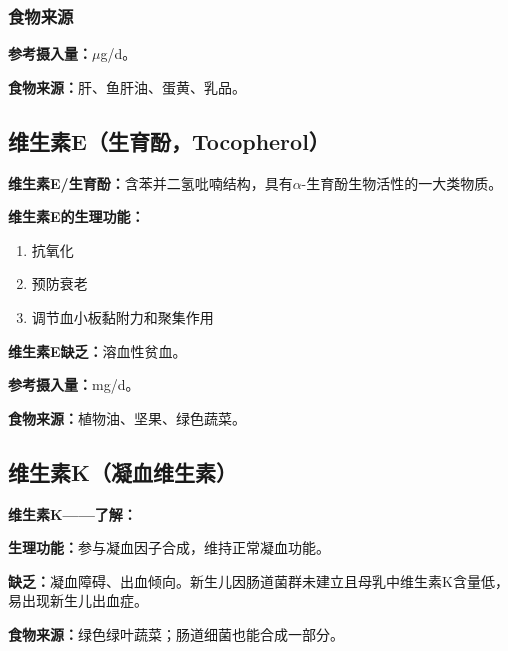 \subsubsection{食物来源}

\begin{keybox}
\textbf{参考摄入量：}$\mu$g/d。

\textbf{食物来源：}肝、鱼肝油、蛋黄、乳品。
\end{keybox}

\subsection{维生素E（生育酚，Tocopherol）}

\begin{defbox}
\textbf{维生素E/生育酚：}含苯并二氢吡喃结构，具有$\alpha$-生育酚生物活性的一大类物质。
\end{defbox}

\begin{keybox}
\textbf{维生素E的生理功能：}
\begin{enumerate}[leftmargin=*]
    \item 抗氧化
    \item 预防衰老
    \item 调节血小板黏附力和聚集作用
\end{enumerate}

\textbf{维生素E缺乏：}溶血性贫血。

\textbf{参考摄入量：}mg/d。

\textbf{食物来源：}植物油、坚果、绿色蔬菜。
\end{keybox}

\subsection{维生素K（凝血维生素）}

\begin{tipbox}
\textbf{维生素K——了解：}

\textbf{生理功能：}参与凝血因子合成，维持正常凝血功能。

\textbf{缺乏：}凝血障碍、出血倾向。新生儿因肠道菌群未建立且母乳中维生素K含量低，易出现新生儿出血症。

\textbf{食物来源：}绿色绿叶蔬菜；肠道细菌也能合成一部分。%
\end{tipbox}

